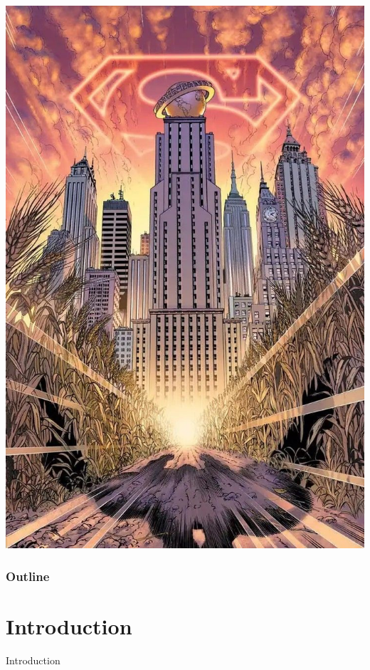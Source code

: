 \documentclass[usernames,dvipsnames]{beamer}
\begin{document}
\begin{frame}
		\includegraphics[scale = 0.18]{images/DailyPlanet}
	\endminipage\hfill
	
\end{frame}

\begin{frame}	
	\frametitle{Outline}
	\tableofcontents
\end{frame}


\section{Introduction}

\begin{frame}	
	\begin{Huge}
		\begin{center}
			Introduction
		\end{center}
	\end{Huge}
\end{frame}
\end{document}
